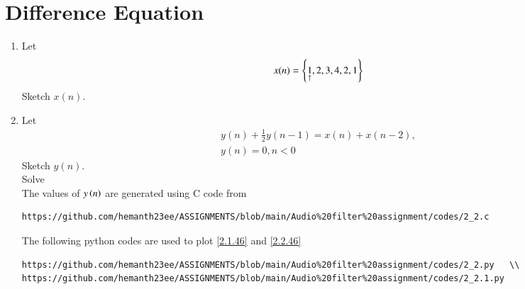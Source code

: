 \documentclass[journal,12pt,twocolumn]{IEEEtran}
\theoremstyle{remark}
\begin{document}
\section{Difference Equation}
\begin{enumerate}
\item Let
\begin{equation}
x(n) = \left\{\underset{\uparrow}{1},2,3,4,2,1\right\} \label{2.1.46}
\end{equation}
Sketch $x(n)$. 
\item Let
\begin{multline}
y(n) + \frac{1}{2}y(n-1) = x(n) + x(n-2), 
\\
y(n) = 0, n < 0 \label{2.2.46}
\end{multline}
Sketch $y(n)$.\\
Solve\\
\solution  The values of $y\left(n\right)$ are generated using C code from
\begin{lstlisting}
https://github.com/hemanth23ee/ASSIGNMENTS/blob/main/Audio%20filter%20assignment/codes/2_2.c
\end{lstlisting} 
The following python codes are used to plot \eqref{2.1.46} and \eqref{2.2.46}
\begin{lstlisting}
https://github.com/hemanth23ee/ASSIGNMENTS/blob/main/Audio%20filter%20assignment/codes/2_2.py   \\
https://github.com/hemanth23ee/ASSIGNMENTS/blob/main/Audio%20filter%20assignment/codes/2_2.1.py
\end{lstlisting}


\end{enumerate}
\end{document}
